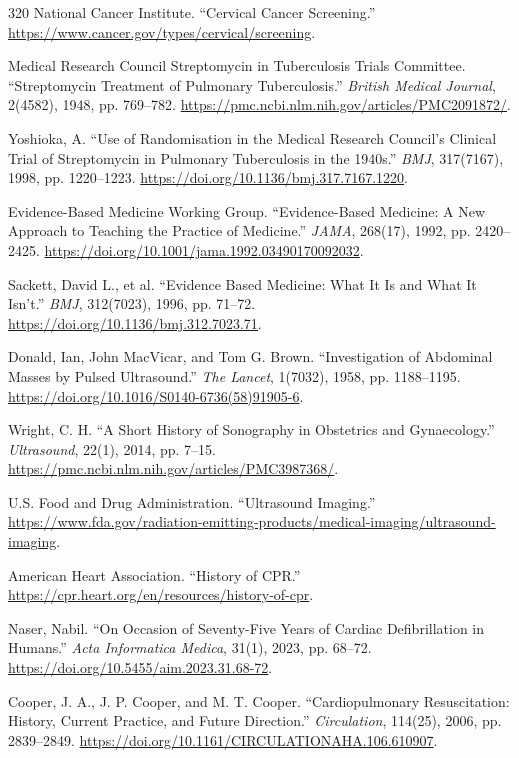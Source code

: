 \documentclass[12pt,oneside]{book}
\begin{document}
\begin{thebibliography}{320}
National Cancer Institute. ``Cervical Cancer Screening.''
\url{https://www.cancer.gov/types/cervical/screening}.

Medical Research Council Streptomycin in Tuberculosis Trials Committee.
``Streptomycin Treatment of Pulmonary Tuberculosis.'' \emph{British Medical
Journal}, 2(4582), 1948, pp. 769--782.
\url{https://pmc.ncbi.nlm.nih.gov/articles/PMC2091872/}.

Yoshioka, A. ``Use of Randomisation in the Medical Research Council's
Clinical Trial of Streptomycin in Pulmonary Tuberculosis in the 1940s.''
\emph{BMJ}, 317(7167), 1998, pp. 1220--1223.
\url{https://doi.org/10.1136/bmj.317.7167.1220}.

Evidence-Based Medicine Working Group. ``Evidence-Based Medicine: A New
Approach to Teaching the Practice of Medicine.'' \emph{JAMA}, 268(17),
1992, pp. 2420--2425.
\url{https://doi.org/10.1001/jama.1992.03490170092032}.

Sackett, David L., et al. ``Evidence Based Medicine: What It Is and What It
Isn't.'' \emph{BMJ}, 312(7023), 1996, pp. 71--72.
\url{https://doi.org/10.1136/bmj.312.7023.71}.

Donald, Ian, John MacVicar, and Tom G. Brown. ``Investigation of Abdominal
Masses by Pulsed Ultrasound.'' \emph{The Lancet}, 1(7032), 1958,
pp. 1188--1195. \url{https://doi.org/10.1016/S0140-6736(58)91905-6}.

Wright, C. H. ``A Short History of Sonography in Obstetrics and
Gynaecology.'' \emph{Ultrasound}, 22(1), 2014, pp. 7--15.
\url{https://pmc.ncbi.nlm.nih.gov/articles/PMC3987368/}.

U.S. Food and Drug Administration. ``Ultrasound Imaging.''
\url{https://www.fda.gov/radiation-emitting-products/medical-imaging/ultrasound-imaging}.

American Heart Association. ``History of CPR.''
\url{https://cpr.heart.org/en/resources/history-of-cpr}.

Naser, Nabil. ``On Occasion of Seventy-Five Years of Cardiac Defibrillation
in Humans.'' \emph{Acta Informatica Medica}, 31(1), 2023, pp. 68--72.
\url{https://doi.org/10.5455/aim.2023.31.68-72}.

Cooper, J. A., J. P. Cooper, and M. T. Cooper. ``Cardiopulmonary
Resuscitation: History, Current Practice, and Future Direction.''
\emph{Circulation}, 114(25), 2006, pp. 2839--2849.
\url{https://doi.org/10.1161/CIRCULATIONAHA.106.610907}.


\end{thebibliography}
\end{document}

